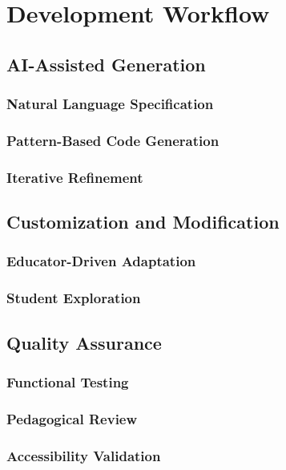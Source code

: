 \section{Development Workflow}
\label{sec:workflow}


\subsection{AI-Assisted Generation}

\subsubsection{Natural Language Specification}

\subsubsection{Pattern-Based Code Generation}

\subsubsection{Iterative Refinement}

\subsection{Customization and Modification}

\subsubsection{Educator-Driven Adaptation}

\subsubsection{Student Exploration}

\subsection{Quality Assurance}

\subsubsection{Functional Testing}

\subsubsection{Pedagogical Review}

\subsubsection{Accessibility Validation}

